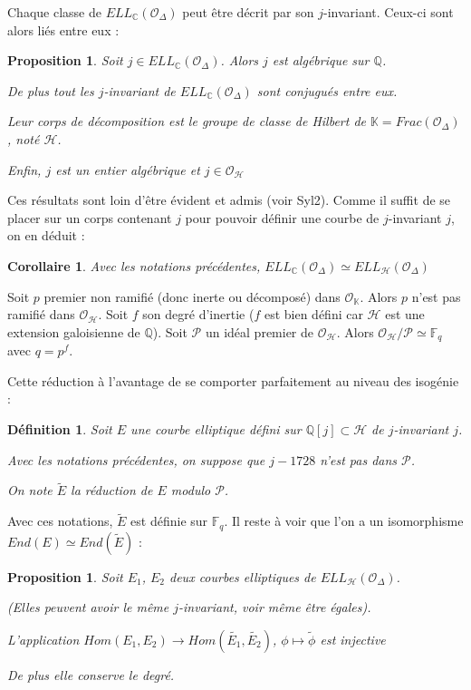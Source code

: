 \documentclass{article}
\newcommand{\Q}[0]{\mathbb{Q}}
\newcommand{\C}[0]{\mathbb{C}}
\newcommand{\K}[0]{\mathbb{K}}
\newcommand{\OR}[0]{\mathcal{O}}
\newcommand{\PR}[0]{\mathcal{P}}
\newcommand{\HR}[0]{\mathcal{H}}
\newcommand{\F}[0]{\mathbb{F}}
\newtheorem{Prop}[The]{Proposition}
\newtheorem{Def}[The]{Définition}
\newtheorem{Coro}[The]{Corollaire}
\begin{document}
Chaque classe de $ELL_{\C}(\OR_{\Delta})$ peut être décrit par son $j$-invariant. Ceux-ci sont alors liés entre eux :

\begin{Prop}
	Soit $j\in ELL_{\C}(\OR_{\Delta})$. Alors $j$ est algébrique sur $\Q$.
	
	De plus tout les $j$-invariant de $ELL_{\C}(\OR_{\Delta})$ sont conjugués entre eux.
	
	Leur corps de décomposition est le groupe de classe de Hilbert de $\K = Frac(\OR_{\Delta})$, noté $\HR$.
	
	Enfin, $j$ est un entier algébrique et $j\in\OR_{\HR}$
\end{Prop}

Ces résultats sont loin d'être évident et admis (voir Syl2). Comme il suffit de se placer sur un corps contenant $j$ pour pouvoir définir une courbe de $j$-invariant $j$, on en déduit :

\begin{Coro}
	Avec les notations précédentes, $ELL_{\C}(\OR_{\Delta})\simeq ELL_{\HR}(\OR_{\Delta})$
\end{Coro}

Soit $p$ premier non ramifié (donc inerte ou décomposé) dans $\OR_{\K}$. Alors $p$ n'est pas ramifié dans $\OR_{\HR}$. Soit $f$ son degré d'inertie ($f$ est bien défini car $\HR$ est une extension galoisienne de $\Q$). Soit $\PR$ un idéal premier de $\OR_{\HR}$. Alors $\OR_{\HR}/\PR\simeq\F_{q}$ avec $q = p^f$.

Cette réduction à l'avantage de se comporter parfaitement au niveau des isogénie :

\begin{Def}
	Soit $E$ une courbe elliptique défini sur $\Q[j]\subset\HR$ de $j$-invariant $j$.
	
	Avec les notations précédentes, on suppose que $j - 1728$ n'est pas dans $\PR$.
	
	On note $\tilde{E}$ la réduction de $E$ modulo $\PR$. 
\end{Def}

Avec ces notations, $\tilde{E}$ est définie sur $\F_{q}$. Il reste à voir que l'on a un isomorphisme $End(E)\simeq End(\tilde{E})$ :

\begin{Prop}
	Soit $E_{1}$, $E_{2}$ deux courbes elliptiques de $ELL_{\HR}(\OR_{\Delta})$. 
	
	(Elles peuvent avoir le même $j$-invariant, voir même être égales).
	
	L'application $Hom(E_{1}, E_{2})\rightarrow Hom(\tilde{E_{1}}, \tilde{E_{2}})$, $\phi\mapsto\tilde{\phi}$ est injective
	
	De plus elle conserve le degré.
\end{Prop}
\end{document}
